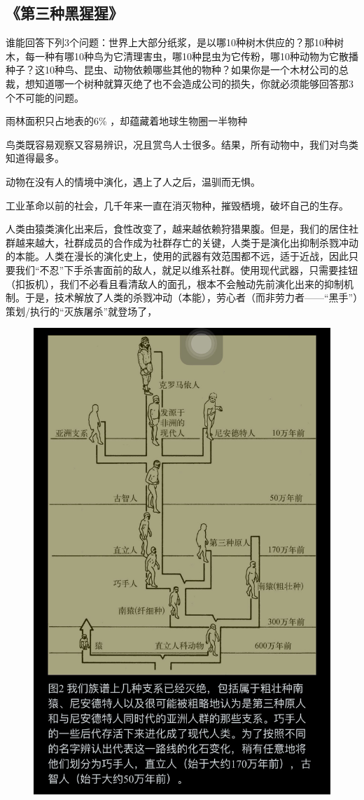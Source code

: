 \subsection{《第三种黑猩猩》}
谁能回答下列3个问题：世界上大部分纸浆，是以哪10种树木供应的？那10种树木，每一种有哪10种鸟为它清理害虫，哪10种昆虫为它传粉，哪10种动物为它散播种子？这10种鸟、昆虫、动物依赖哪些其他的物种？如果你是一个木材公司的总裁，想知道哪一个树种就算灭绝了也不会造成公司的损失，你就必须能够回答那3个不可能的问题。

雨林面积只占地表的6\% ，却蕴藏着地球生物圈一半物种

鸟类既容易观察又容易辨识，况且赏鸟人士很多。结果，所有动物中，我们对鸟类知道得最多。

动物在没有人的情境中演化，遇上了人之后，温驯而无惧。

工业革命以前的社会，几千年来一直在消灭物种，摧毁栖境，破坏自己的生存。

人类由猿类演化出来后，食性改变了，越来越依赖狩猎果腹。但是，我们的居住社群越来越大，社群成员的合作成为社群存亡的关键，人类于是演化出抑制杀戮冲动的本能。人类在漫长的演化史上，使用的武器有效范围都不远，适于近战，因此只要我们“不忍”下手杀害面前的敌人，就足以维系社群。使用现代武器，只需要挂钮（扣扳机），我们不必看且看清敌人的面孔，根本不会触动先前演化出来的抑制机制。于是，技术解放了人类的杀戮冲动（本能），劳心者（而非劳力者——“黑手”）策划/执行的“灭族屠杀”就登场了， 
\begin{figure}[htpb]
	\centering
	\includegraphics[width=0.6\linewidth]{images/hxx.jpg}
\end{figure}

